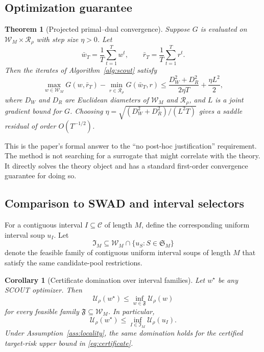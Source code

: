 \documentclass{article}
\newtheorem{theorem}{Theorem}
\newtheorem{corollary}{Corollary}
\newcommand{\cC}{\mathcal{C}}
\newcommand{\cR}{\mathcal{R}}
\newcommand{\cW}{\mathcal{W}}
\newcommand{\scout}{\textup{\textsc{SCOUT}}}
\newcommand{\swad}{\textup{\textsc{SWAD}}}
\begin{document}
\subsection{Optimization guarantee}

\begin{theorem}[Projected primal--dual convergence]
\label{thm:convergence}
Suppose \(G\) is evaluated on \(\cW_M\times \cR_\rho\) with step size \(\eta>0\). Let
\[
    \bar w_T = \frac{1}{T}\sum_{t=1}^{T} w^t,
    \qquad
    \bar r_T = \frac{1}{T}\sum_{t=1}^{T} r^t.
\]
Then the iterates of Algorithm~\ref{alg:scout} satisfy
\begin{equation}
    \max_{w\in\cW_M} G(w,\bar r_T)
    -
    \min_{r\in\cR_\rho} G(\bar w_T,r)
    \le
    \frac{D_W^2 + D_R^2}{2\eta T}
    +
    \frac{\eta L^2}{2},
    \label{eq:convergence}
\end{equation}
where \(D_W\) and \(D_R\) are Euclidean diameters of \(\cW_M\) and \(\cR_\rho\), and \(L\) is a joint gradient bound for \(G\). Choosing \(\eta = \sqrt{(D_W^2+D_R^2)/(L^2 T)}\) gives a saddle residual of order \(O(T^{-1/2})\).
\end{theorem}

This is the paper's formal answer to the ``no post-hoc justification'' requirement. The method is not searching for a surrogate that might correlate with the theory. It directly solves the theory object and has a standard first-order convergence guarantee for doing so.

\subsection{Comparison to \swad{} and interval selectors}

For a contiguous interval \(I\subseteq \cC\) of length \(M\), define the corresponding uniform interval soup \(u_I\). Let
\[
    \mathfrak{I}_M
    \subseteq
    \cW_M
    \cap \{u_S:S\in\mathfrak{S}_M\}
\]
denote the feasible family of contiguous uniform interval soups of length \(M\) that satisfy the same candidate-pool restrictions.

\begin{corollary}[Certificate domination over interval families]
\label{cor:dominate}
Let \(w^\star\) be any \scout{} optimizer. Then
\begin{equation}
    \mathcal{U}_\rho(w^\star)
    \le
    \inf_{w\in \mathfrak{F}} \mathcal{U}_\rho(w)
    \label{eq:family_domination}
\end{equation}
for every feasible family \(\mathfrak{F}\subseteq \cW_M\). In particular,
\begin{equation}
    \mathcal{U}_\rho(w^\star)
    \le
    \inf_{I\in \mathfrak{I}_M} \mathcal{U}_\rho(u_I).
    \label{eq:interval_domination}
\end{equation}
Under Assumption~\ref{ass:locality}, the same domination holds for the certified target-risk upper bound in \eqref{eq:certificate}.
\end{corollary}
\end{document}
